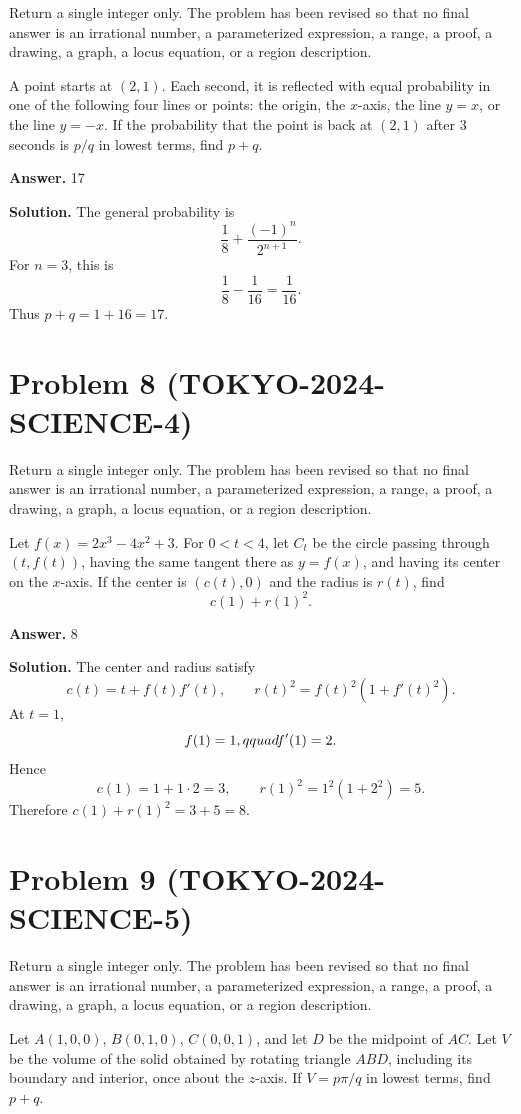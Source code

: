 \documentclass[11pt]{article}
\begin{document}
Return a single integer only. The problem has been revised so that no final answer is an irrational number, a parameterized expression, a range, a proof, a drawing, a graph, a locus equation, or a region description.

A point starts at \((2,1)\). Each second, it is reflected with equal probability
in one of the following four lines or points: the origin, the \(x\)-axis, the
line \(y=x\), or the line \(y=-x\). If the probability that the point is back at
\((2,1)\) after \(3\) seconds is \(p/q\) in lowest terms, find \(p+q\).


\textbf{Answer.} 17


\textbf{Solution.}
The general probability is
\[
\frac18+\frac{(-1)^n}{2^{n+1}}.
\]
For \(n=3\), this is
\[
\frac18-\frac1{16}=\frac1{16}.
\]
Thus \(p+q=1+16=17\).


\section*{Problem 8 (TOKYO-2024-SCIENCE-4)}

Return a single integer only. The problem has been revised so that no final answer is an irrational number, a parameterized expression, a range, a proof, a drawing, a graph, a locus equation, or a region description.

Let \(f(x)=2x^3-4x^2+3\). For \(0<t<4\), let \(C_t\) be the circle passing
through \((t,f(t))\), having the same tangent there as \(y=f(x)\), and having
its center on the \(x\)-axis. If the center is \((c(t),0)\) and the radius is
\(r(t)\), find
\[
c(1)+r(1)^2.
\]


\textbf{Answer.} 8


\textbf{Solution.}
The center and radius satisfy
\[
c(t)=t+f(t)f'(t),\qquad r(t)^2=f(t)^2(1+f'(t)^2).
\]
At \(t=1\),
\[
f(1)=1,\\qquad f'(1)=2.
\]
Hence
\[
c(1)=1+1\cdot2=3,
\qquad r(1)^2=1^2(1+2^2)=5.
\]
Therefore \(c(1)+r(1)^2=3+5=8\).


\section*{Problem 9 (TOKYO-2024-SCIENCE-5)}

Return a single integer only. The problem has been revised so that no final answer is an irrational number, a parameterized expression, a range, a proof, a drawing, a graph, a locus equation, or a region description.

Let \(A(1,0,0)\), \(B(0,1,0)\), \(C(0,0,1)\), and let \(D\) be the midpoint of
\(AC\). Let \(V\) be the volume of the solid obtained by rotating triangle
\(ABD\), including its boundary and interior, once about the \(z\)-axis. If
\(V=p\pi/q\) in lowest terms, find \(p+q\).
\end{document}
